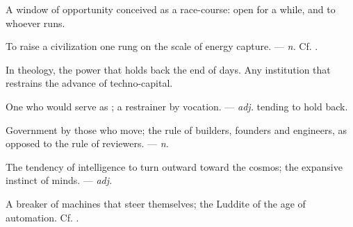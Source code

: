  A window of opportunity conceived as a race-course: open for a while, and to whoever runs.  

 To raise a civilization one rung on the scale of energy capture. ---  \textit{n.} Cf. .

  In theology, the power that holds back the end of days.   Any institution that restrains the advance of techno-capital.

 One who would serve as ; a restrainer by vocation. ---  \textit{adj.} tending to hold back.

 Government by those who move; the rule of builders, founders and engineers, as opposed to the rule of reviewers. ---  \textit{n.}

 The tendency of intelligence to turn outward toward the cosmos; the expansive instinct of minds. ---  \textit{adj.}

 A breaker of machines that steer themselves; the Luddite of the age of automation. Cf. .
